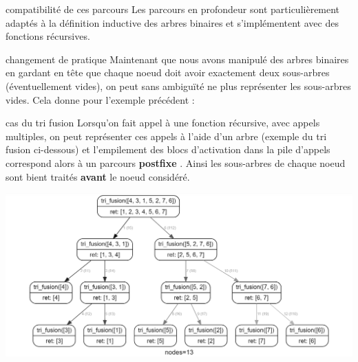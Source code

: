 \begin{remarque}{7.17}{compatibilité de ces parcours}
    Les parcours en profondeur sont particulièrement adaptés à la définition inductive des arbres binaires et s'implémentent avec des fonctions récursives.
\end{remarque}

\begin{remarque}{7.18}{changement de pratique}
    Maintenant que nous avons manipulé des arbres binaires en gardant en tête que chaque noeud doit avoir exactement deux sous-arbres (éventuellement vides), on peut sans ambiguïté ne plus représenter les sous-arbres vides. Cela donne pour l'exemple précédent :
    \begin{center}
\end{center}
\end{remarque}

\begin{exemple}{7.19}{cas du tri fusion}
    Lorsqu'on fait appel à une fonction récursive, avec appels multiples, on peut représenter ces appels à l'aide d'un arbre (exemple du tri fusion ci-dessous) et l'empilement des blocs d'activation dans la pile d'appels correspond alors à un  parcours \textbf{postfixe} . Ainsi les sous-arbres de chaque noeud sont bient traités  \textbf{avant} le noeud considéré.
    \begin{center}
        \includegraphics[scale = 0.65]{tri-fusion.png}
    \end{center}
\end{exemple}

